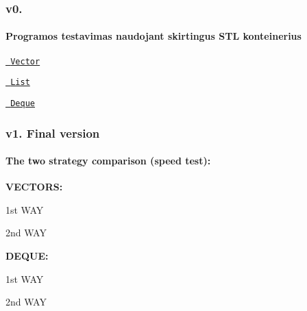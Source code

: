 \subsubsection*{v0.}

\paragraph*{Programos testavimas naudojant skirtingus S\+TL konteinerius}


\begin{DoxyItemize}
\item \href{https://imgur.com/skcD1pY.png}{\texttt{ Vector}}
\item \href{https://imgur.com/D1COYZj.png}{\texttt{ List}}
\item \href{https://imgur.com/6vJbsoB.png}{\texttt{ Deque}}
\end{DoxyItemize}

\subsubsection*{v1. Final version}

\paragraph*{The two strategy comparison (speed test)\+:}

{\bfseries{V\+E\+C\+T\+O\+RS\+:}}
\begin{DoxyItemize}
\item 1st W\+AY 
\begin{DoxyCode}{0}
\end{DoxyCode}

\item 2nd W\+AY 
\begin{DoxyCode}{0}
\end{DoxyCode}

\end{DoxyItemize}

{\bfseries{D\+E\+Q\+UE\+:}}
\begin{DoxyItemize}
\item 1st W\+AY 
\begin{DoxyCode}{0}
\end{DoxyCode}

\item 2nd W\+AY 
\begin{DoxyCode}{0}
\end{DoxyCode}

\end{DoxyItemize}

